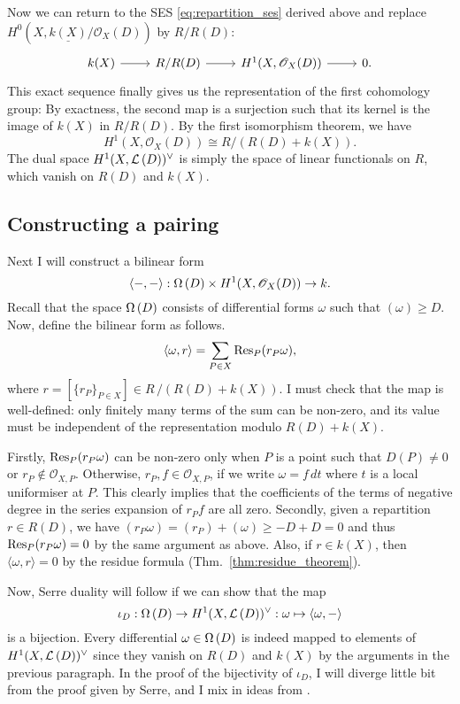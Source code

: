 Now we can return to the SES \eqref{eq:repartition_ses} derived above and
replace $H^{0}(X,\underline{k(X)}/\mathscr{O}_X(D))$ by $R/R(D)$:
\[
  \begin{tikzcd}
    k(X)\rar & R/R(D)\rar & H^{1}(X,\mathscr{O}_X(D))\rar & 0.
  \end{tikzcd}
\]
This exact sequence finally gives us the representation of the first
cohomology group: By exactness, the second map is a surjection such that
its kernel is the image of $k(X)$ in $R/R(D)$. By the first isomorphism theorem,
we have
\[H^{1}(X,\mathscr{O}_X(D))\cong R/\left(R(D)+k(X)\right).\]
The dual space $H^1(X,\mathcal{L}\left(D\right))^{\vee}$ is simply the space
of linear functionals on $R$, which vanish on $R(D)$ and $k(X)$.

\subsection{Constructing a pairing}
Next I will construct a bilinear form
\[
  \langle -,-\rangle:\Omega\left(D\right)\times H^{1}(X,\mathscr{O}_X(D))\to k.
\]
Recall that the space $\Omega\left(D\right)$ consists of differential forms $\omega$
such that $(\omega)\geq D$. Now, define the bilinear form as follows.
\[
  \langle\omega,r\rangle=\sum_{P\in X}\operatorname{Res}_{P}(r_{P}\omega),
\]
where $r=[\{r_{P}\}_{P\in X}]\in R\,/\left(R(D)+k(X)\right)$. I must check
that the map is well-defined: only finitely many terms of the sum can be
non-zero, and its value must be independent of the representation modulo
$R(D)+k(X)$.

Firstly, $\operatorname{Res}_{P}(r_{P}\omega)$ can be non-zero only when $P$ is a point
such that $D(P)\neq 0$ or $r_{P}\not\in\mathscr{O}_{X,P}$. Otherwise,
$r_{P},f\in\mathscr{O}_{X,P}$, if we write $\omega=f\,dt$ where $t$ is a
local uniformiser at $P$. This clearly implies that the coefficients of the
terms of negative degree in the series expansion of $r_{P}f$ are all zero.
Secondly, given a repartition $r\in R(D)$, we have $(r_{P}\omega)
=(r_{P})+(\omega) \geq -D+D=0$ and thus $\operatorname{Res}_{P}(r_{P}\omega)=0$ by the same
argument as above. Also, if $r\in k(X)$, then $\langle \omega,r\rangle=0$ by
the residue formula (Thm.~\ref{thm:residue_theorem}).

Now, Serre duality will follow if we can show that the map
\[
  \iota_{D}:\Omega\left(D\right)\to H^1(X,\mathcal{L}\left(D\right))^{\vee}
  :\omega\mapsto\langle\omega,-\rangle
\]
is a bijection. Every differential $\omega\in\Omega\left(D\right)$ is indeed mapped
to elements of \linebreak $H^1(X,\mathcal{L}\left(D\right))^{\vee}$ since they vanish on $R(D)$ and $k(X)$
by the arguments in the previous paragraph. In the proof of the bijectivity of
$\iota_{D}$, I will diverge little bit from the proof given by Serre, and
I mix in ideas from \cite{forster}.

